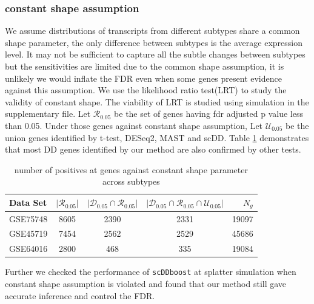 \documentclass[aoas,preprint]{imsart}
\begin{document}

\subsubsection{constant shape assumption}
We assume distributions of transcripts from different subtypes share a common shape parameter, the only difference between subtypes is the average expression level.
It may not be sufficient to capture all the subtle changes between subtypes but the sensitivities are limited due to the common shape assumption, 
it is unlikely we would inflate the FDR even when some genes present evidence against this assumption. 
We use the likelihood ratio test(LRT) to study the validity of constant shape.
The viability of LRT is studied using simulation in the supplementary file. 
Let $\mathcal{R}_{0.05}$ be the set of genes having fdr adjusted p value less than 0.05. 
Under those genes against constant shape assumption, 
Let $\mathcal{U}_{0.05}$ be the union genes identified by t-test, DESeq2, MAST and scDD.
Table \ref{tab:cs} demonstrates that most DD genes identified by our method are also confirmed by other tests. 
\begin{table}[htbp]
  \begin{center}
  \begin{tabular}{@{} lcccr @{}} %
      \toprule
      \cmidrule(r){1-5} %
      Data Set   & $|\mathcal{R}_{0.05}|$ &
      $|\mathcal{D}_{0.05} \cap \mathcal{R}_{0.05}| $ & $|\mathcal{D}_{0.05} \cap \mathcal{R}_{0.05} \cap \mathcal{U}_{0.05}|$ & $N_g$   \\
      \midrule
      GSE75748   & 8605 & 2390 & 2331 & 19097\\          
      GSE45719   & 7454 & 2562 & 2529 & 45686\\
      GSE64016   & 2800 & 468 & 335 & 19084\\
      \bottomrule
  \end{tabular}
  \caption{number of positives at genes against constant shape parameter across subtypes}
  \label{tab:cs}
  \end{center}
\end{table}

Further we checked the performance of \texttt{scDDboost} at splatter simulation when constant shape assumption is violated and found that our method still gave accurate inference and control the FDR.
\end{document}
